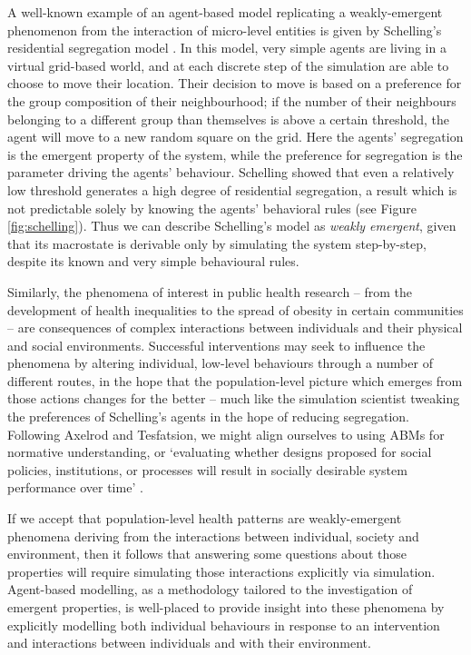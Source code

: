 \documentclass[review]{elsarticle}
\begin{document}
A well-known example of an agent-based model replicating a weakly-emergent phenomenon from the interaction of micro-level entities is given by Schelling's residential segregation model \citep{schelling71, schelling78}. In this model, very simple agents are living in a virtual grid-based world, and at each discrete step of the simulation are able to choose to move their location.  Their decision to move is based on a preference for the group composition of their neighbourhood; if the number of their neighbours belonging to a different group than themselves is above a certain threshold, the agent will move to a new random square on the grid.  Here the agents' segregation is the emergent property of the system, while the preference for segregation is the parameter driving the agents' behaviour. Schelling showed that even a relatively low threshold generates a high degree of residential segregation, a result which is not predictable solely by knowing the agents' behavioral rules (see Figure \ref{fig:schelling}).  Thus we can describe Schelling's model as \emph{weakly emergent}, given that its macrostate is derivable only by simulating the system step-by-step, despite its known and very simple behavioural rules.

Similarly, the phenomena of interest in public health research -- from the development of health inequalities to the spread of obesity in certain communities -- are consequences of complex interactions between individuals and their physical and social environments. Successful interventions may seek to influence the phenomena by altering individual, low-level behaviours through a number of different routes, in the hope that the population-level picture which emerges from those actions changes for the better -- much like the simulation scientist tweaking the preferences of Schelling's agents in the hope of reducing segregation. Following Axelrod and Tesfatsion, we might align ourselves to using ABMs for normative understanding, or `evaluating whether designs proposed for social policies, institutions, or processes will result in socially desirable system performance over time' \citep{axelrod05}.

If we accept that population-level health patterns are weakly-emergent phenomena deriving from the interactions between individual, society and environment, then it follows that answering some questions about those properties will require simulating those interactions explicitly via simulation.  Agent-based modelling, as a methodology tailored to the investigation of emergent properties, is well-placed to provide insight into these phenomena by explicitly modelling both individual behaviours in response to an intervention and interactions between individuals and with their environment.  
\end{document}
